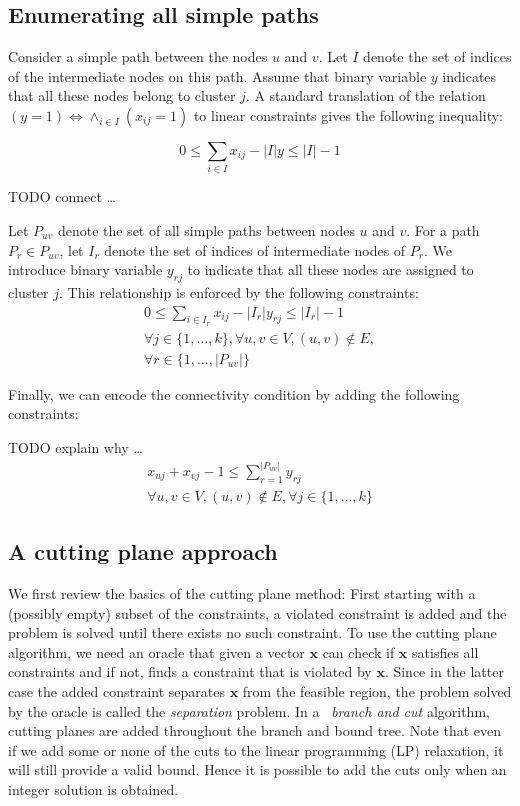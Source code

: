 \documentclass[conference,compsoc]{IEEEtran}
\begin{document}
\subsection{Enumerating all simple paths}
\label{sec:enumerate}

Consider a simple path between the nodes $u$ and $v$. Let $I$ denote the set of indices of the intermediate nodes on this path. Assume that binary variable $y$ indicates that all these nodes belong to cluster $j$. A standard translation of the relation $(y=1) \Leftrightarrow \land_{i \in I} (x_{ij}=1)$ to linear constraints gives the following inequality:

\begin{equation}
0 \leq \sum_{i \in I} x_{ij} - |I|y \leq |I|-1
\end{equation}

TODO connect \ldots

Let $P_{uv}$ denote the set of all simple paths between nodes $u$ and $v$. For a path $P_r \in P_{uv}$, let $I_r$ denote the set of indices of intermediate nodes of $P_r$. We introduce binary variable $y_{rj}$ to indicate that all these nodes are assigned to cluster $j$. This relationship is enforced by the following constraints:
\begin{multline}
0 \leq \sum_{i\in I_r} x_{ij} - |I_r| y_{rj} \leq |I_r| - 1 \\
\forall j \in \{1, \ldots, k\}, \forall u, v \in V, (u, v) \notin E, \\ \forall r \in \{1, \ldots, |P_{uv}|\}
\label{cons:path}
\end{multline}

Finally, we can encode the connectivity condition by adding the following constraints:

TODO explain why \ldots
\begin{multline}
x_{uj} + x_{vj} -1 \leq \sum_{r=1}^{|P_{uv}|} y_{rj} \\
\forall u, v \in V, (u, v) \notin E, \forall j \in \{1, \ldots, k\}
\label{cons:pconnect}
\end{multline}

\subsection{A cutting plane approach}
\label{sec:bnc}
 We first review the basics of the cutting plane method: First starting with a (possibly empty) subset of the constraints, a violated constraint is added and the problem is solved until there exists no such constraint. To use the cutting plane algorithm, we need an oracle that given a vector $\mathbf{x}$ can check if $\mathbf{x}$ satisfies all constraints and if not, finds a constraint that is violated by $\mathbf{x}$. Since in the latter case the added constraint separates $\mathbf{x}$ from the feasible region, the problem solved by the oracle is called the \emph{separation} problem. In a ~\emph{branch and cut} algorithm, cutting planes are added throughout the branch and bound tree. Note that even if we add some or none of the cuts to the linear programming (LP) relaxation, it will still provide a valid bound. Hence it is possible to add the cuts only when an integer solution is obtained.
 
\end{document}
